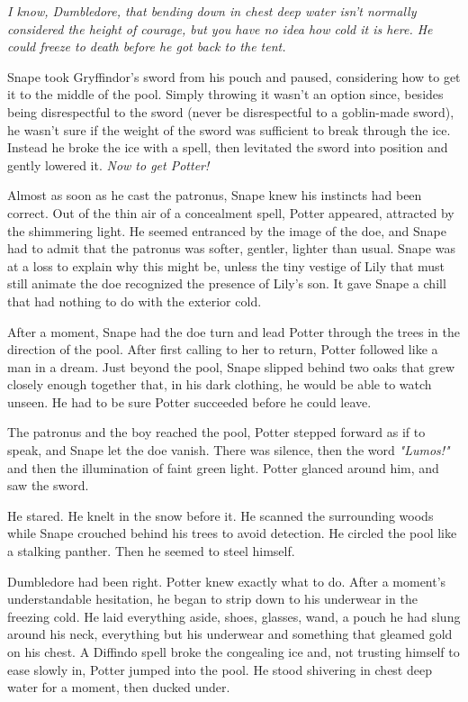 \documentclass[a4paper,11pt]{article}
\begin{document}
\emph{I know, Dumbledore, that bending down in chest deep water isn't normally considered the height of courage, but you have no idea how cold it is here. He could freeze to death before he got back to the tent.}

Snape took Gryffindor's sword from his pouch and paused, considering how to get it to the middle of the pool. Simply throwing it wasn't an option since, besides being disrespectful to the sword (never be disrespectful to a goblin-made sword), he wasn't sure if the weight of the sword was sufficient to break through the ice. Instead he broke the ice with a spell, then levitated the sword into position and gently lowered it. \emph{Now to get Potter!}

Almost as soon as he cast the patronus, Snape knew his instincts had been correct. Out of the thin air of a concealment spell, Potter appeared, attracted by the shimmering light. He seemed entranced by the image of the doe, and Snape had to admit that the patronus was softer, gentler, lighter than usual. Snape was at a loss to explain why this might be, unless the tiny vestige of Lily that must still animate the doe recognized the presence of Lily's son. It gave Snape a chill that had nothing to do with the exterior cold.

After a moment, Snape had the doe turn and lead Potter through the trees in the direction of the pool. After first calling to her to return, Potter followed like a man in a dream. Just beyond the pool, Snape slipped behind two oaks that grew closely enough together that, in his dark clothing, he would be able to watch unseen. He had to be sure Potter succeeded before he could leave.

The patronus and the boy reached the pool, Potter stepped forward as if to speak, and Snape let the doe vanish. There was silence, then the word \emph{"Lumos!"} and then the illumination of faint green light. Potter glanced around him, and saw the sword.

He stared. He knelt in the snow before it. He scanned the surrounding woods while Snape crouched behind his trees to avoid detection. He circled the pool like a stalking panther. Then he seemed to steel himself.

Dumbledore had been right. Potter knew exactly what to do. After a moment's understandable hesitation, he began to strip down to his underwear in the freezing cold. He laid everything aside, shoes, glasses, wand, a pouch he had slung around his neck, everything but his underwear and something that gleamed gold on his chest. A Diffindo spell broke the congealing ice and, not trusting himself to ease slowly in, Potter jumped into the pool. He stood shivering in chest deep water for a moment, then ducked under.
\end{document}
